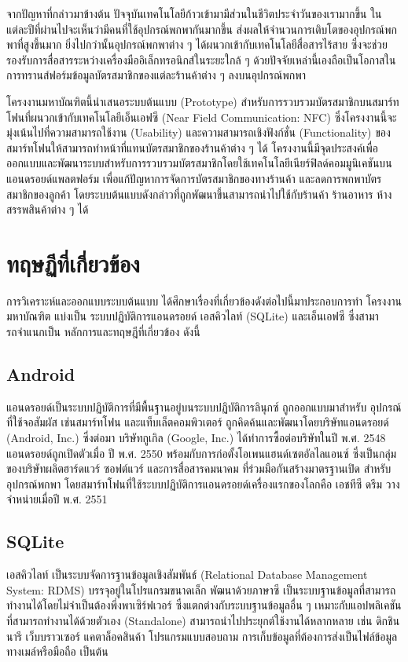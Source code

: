 \documentclass[a4paper]{article}
\begin{document}
จากปัญหาที่กล่าวมาข้างต้น ปัจจุบันเทคโนโลยีก้าวเข้ามามีส่วนในชีวิตประจำวันของเรามากขึ้น ในแต่ละปีที่ผ่านไปจะเห็นว่ามีคนที่ใช้อุปกรณ์พกพากันมากขึ้น ส่งผลให้จำนวนการเติบโตของอุปกรณ์พกพาที่สูงขึ้นมาก ยิ่งไปกว่านั้นอุปกรณ์พกพาต่าง ๆ ได้ผนวกเข้ากับเทคโนโลยีสื่อสารไร้สาย ซึ่งจะช่วยรองรับการสื่อสารระหว่างเครื่องมืออิเล็กทรอนิกส์ในระยะใกล้ ๆ ด้วยปัจจัยเหล่านี้เองถือเป็นโอกาสในการทรานส์ฟอร์มข้อมูลบัตรสมาชิกของแต่ละร้านค้าต่าง ๆ ลงบนอุปกรณ์พกพา

โครงงานมหาบัณฑิตนี้นำเสนอระบบต้นแบบ (Prototype) สำหรับการรวบรวมบัตรสมาชิกบนสมาร์ทโฟนที่ผนวกเข้ากับเทคโนโลยีเอ็นเอฟซี (Near Field Communication: NFC) ซึ่งโครงงานนี้จะมุ่งเน้นไปที่ความสามารถใช้งาน (Usability) และความสามารถเชิงฟังก์ชั่น (Functionality) ของสมาร์ทโฟนให้สามารถทำหน้าที่แทนบัตรสมาชิกของร้านค้าต่าง ๆ ได้ โครงงานนี้มีจุดประสงค์เพื่อออกแบบและพัฒนาระบบสำหรับการรวบรวมบัตรสมาชิกโดยใช้เทคโนโลยีเนียร์ฟิลด์คอมมูนิเคชันบนแอนดรอยด์แพลตฟอร์ม เพื่อแก้ปัญหาการจัดการบัตรสมาชิกของทางร้านค้า และลดการพกพาบัตรสมาชิกของลูกค้า โดยระบบต้นแบบดังกล่าวที่ถูกพัฒนาขึ้นสามารถนำไปใช้กับร้านค้า ร้านอาหาร ห้างสรรพสินค้าต่าง ๆ ได้

\section{ทฤษฏีที่เกี่ยวข้อง}

การวิเคราะห์และออกแบบระบบต้นแบบ ได้ศึกษาเรื่องที่เกี่ยวข้องดังต่อไปนี้มาประกอบการทํา โครงงานมหาบัณฑิต แบ่งเป็น ระบบปฏิบัติการแอนดรอยด์ เอสคิวไลท์ (SQLite) และเอ็นเอฟซี ซึ่งสามารถจําแนกเป็น หลักการและทฤษฎีที่เกี่ยวข้อง ดังนี้

\subsection{Android}
แอนดรอยด์เป็นระบบปฏิบัติการที่มีพื้นฐานอยู่บนระบบปฏิบัติการลินุกซ์ ถูกออกแบบมาสำหรับ \newline อุปกรณ์ที่ใช้จอสัมผัส เช่นสมาร์ทโฟน และแท็บเล็ตคอมพิวเตอร์ ถูกคิดค้นและพัฒนาโดยบริษัทแอนดรอยด์ (Android, Inc.) ซึ่งต่อมา บริษัทกูเกิล (Google, Inc.) ได้ทำการซื้อต่อบริษัทในปี พ.ศ. 2548 แอนดรอยด์ถูกเปิดตัวเมื่อ ปี พ.ศ. 2550 พร้อมกับการก่อตั้งโอเพนแฮนด์เซตอัลไลแอนซ์ ซึ่งเป็นกลุ่มของบริษัทผลิตฮาร์ดแวร์ ซอฟต์แวร์ และการสื่อสารคมนาคม ที่ร่วมมือกันสร้างมาตรฐานเปิด สำหรับอุปกรณ์พกพา โดยสมาร์ทโฟนที่ใช้ระบบปฏิบัติการแอนดรอยด์เครื่องแรกของโลกคือ เอชทีซี ดรีม วางจำหน่ายเมื่อปี พ.ศ. 2551

\subsection{SQLite}
เอสคิวไลท์ เป็นระบบจัดการฐานข้อมูลเชิงสัมพันธ์ (Relational Database Management System: RDMS) บรรจุอยู่ในโปรแกรมขนาดเล็ก พัฒนาด้วยภาษาซี เป็นระบบฐานข้อมูลที่สามารถทำงานได้โดยไม่จำเป็นต้องพึ่งพาเซิร์ฟเวอร์ ซึ่งแตกต่างกับระบบฐานข้อมูลอื่น ๆ เหมาะกับแอปพลิเคชันที่สามารถทำงานได้ด้วยตัวเอง (Standalone) สามารถนำไปประยุกต์ใช้งานได้หลากหลาย เช่น ดิกชินนารี เว็บบราวเซอร์ แคตาล็อคสินค้า โปรแกรมแบบสอบถาม การเก็บข้อมูลที่ต้องการส่งเป็นไฟล์ข้อมูลทางเมล์หรือมือถือ เป็นต้น
\end{document}
